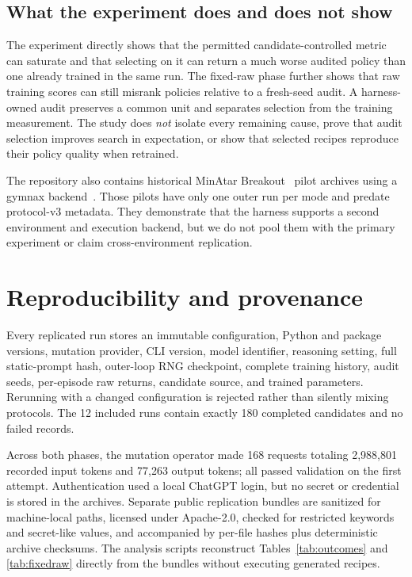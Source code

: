 \documentclass[11pt]{article}
\begin{document}
\subsection{What the experiment does and does not show}

The experiment directly shows that the permitted candidate-controlled metric can saturate and
that selecting on it can return a much worse audited policy than one already trained in the same
run. The fixed-raw phase further shows that raw training scores can still misrank policies relative
to a fresh-seed audit. A harness-owned audit preserves a common unit and separates selection from
the training measurement. The study does \emph{not} isolate every remaining cause, prove that
audit selection improves search in expectation, or show that selected recipes reproduce their
policy quality when retrained.

The repository also contains historical MinAtar Breakout~\citep{young2019minatar} pilot archives
using a gymnax backend~\citep{lange2022gymnax}. Those pilots have only one outer run per mode and
predate protocol-v3 metadata. They demonstrate that the harness supports a second environment and
execution backend, but we do not pool them with the primary experiment or claim cross-environment
replication.

\section{Reproducibility and provenance}

Every replicated run stores an immutable configuration, Python and package versions, mutation
provider, CLI version, model identifier, reasoning setting, full static-prompt hash, outer-loop
RNG checkpoint, complete training history, audit seeds, per-episode raw returns, candidate source,
and trained parameters. Rerunning with a changed configuration is rejected rather than silently
mixing protocols. The 12 included runs contain exactly 180 completed candidates and no failed
records.

Across both phases, the mutation operator made 168 requests totaling 2,988,801 recorded input
tokens and 77,263 output tokens; all passed validation on the first attempt. Authentication used a
local ChatGPT login, but no secret or credential is stored in the archives. Separate public
replication bundles are sanitized for machine-local paths, licensed under Apache-2.0, checked for
restricted keywords and secret-like values, and accompanied by per-file hashes plus deterministic
archive checksums. The analysis scripts reconstruct Tables~\ref{tab:outcomes} and
\ref{tab:fixedraw} directly from the bundles without executing generated recipes.
\end{document}
